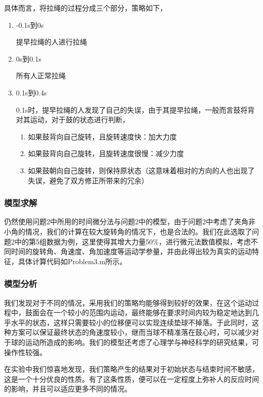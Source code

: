 \documentclass[nocover]{cumcmart}%
\begin{document}
具体而言，将拉绳的过程分成三个部分，策略如下，

\begin{enumerate}
    \item -0.1s到0s
    
    提早拉绳的人进行拉绳
    \item 0s到0.1s
    
    所有人正常拉绳
    \item 0.1s到0.4s
    
    0.1s时，提早拉绳的人发现了自己的失误，由于其提早拉绳，一般而言鼓将背对其运动，对于鼓的状态进行判断，
    \begin{enumerate}
        \item 如果鼓背向自己旋转，且旋转速度快：加大力度
        \item 如果鼓背向自己旋转，且旋转速度很慢：减少力度
        \item 如果鼓朝向自己旋转，则保持原状态（这意味着相对的方向的人也出现了失误，避免了双方修正所带来的冗余）
    \end{enumerate}
\end{enumerate}

\subsubsection{模型求解}
仍然使用问题2中所用的时间微分法与问题2中的模型，由于问题2中考虑了夹角非小角的情况，我们的计算在较大旋转角的情况下，也是合法的。我们在此选取了问题2中的第5组数据为例，这里使得其增大力量50\%，进行微元法数值模拟，考虑不同时间的旋转角、角速度、角加速度等运动学参量，并由此得出较为真实的运动特征，具体计算代码如Problem3.m所示。

\subsubsection{模型分析}
我们发现对于不同的情况，采用我们的策略均能够得到较好的效果，在这个运动过程中，鼓面会在一个较小的范围内运动，最终能够在要求时间内较为稳定地达到几乎水平的状态，这样只需要较小的位移便可以实现连续垫球不掉落。于此同时，这种方案可以保证最终状态的角速度较小，继而当球不精准落在鼓心时，可以减少对于球的运动所造成的影响。我们的模型还考虑了心理学与神经科学的研究结果，可操作性较强。

在实验中我们惊喜地发现，我们策略产生的结果对于初始状态与结束时间不敏感，这是一个十分优良的性质。有了这条性质，便可以在一定程度上弥补人的反应时间的影响，并且可以适应更多不同的情况。
\end{document}
